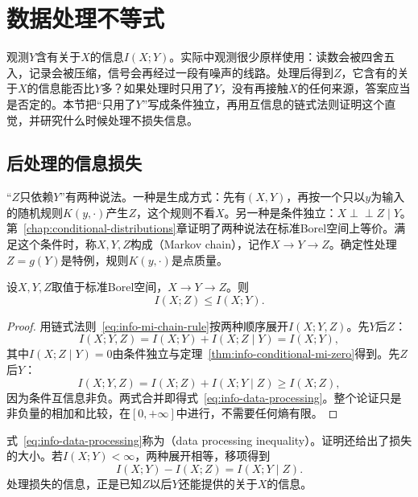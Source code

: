 \section{数据处理不等式}
\label{sec:info-data-processing}

观测$Y$含有关于$X$的信息$I(X;Y)$。实际中观测很少原样使用：读数会被四舍五入，记录会被压缩，信号会再经过一段有噪声的线路。处理后得到$Z$，它含有的关于$X$的信息能否比$Y$多？如果处理时只用了$Y$，没有再接触$X$的任何来源，答案应当是否定的。本节把“只用了$Y$”写成条件独立，再用互信息的链式法则证明这个直觉，并研究什么时候处理不损失信息。

\subsection{后处理的信息损失}
\label{sec:info-dpi-loss}

“$Z$只依赖$Y$”有两种说法。一种是生成方式：先有$(X,Y)$，再按一个只以$y$为输入的随机规则$K(y,\cdot)$产生$Z$，这个规则不看$X$。另一种是条件独立：$X\perp\!\!\!\perp Z\mid Y$。第~\ref{chap:conditional-distributions}章证明了两种说法在标准Borel空间上等价。满足这个条件时，称$X,Y,Z$构成（Markov chain），记作$X\to Y\to Z$。确定性处理$Z=g(Y)$是特例，规则$K(y,\cdot)$是点质量。

\begin{theorem}[数据处理不等式]
\label{thm:info-data-processing}
设$X,Y,Z$取值于标准Borel空间，$X\to Y\to Z$。则
\begin{equation}
  I(X;Z)\leq I(X;Y).
  \label{eq:info-data-processing}
\end{equation}
\end{theorem}

\begin{proof}
用链式法则~\eqref{eq:info-mi-chain-rule}按两种顺序展开$I(X;Y,Z)$。先$Y$后$Z$：
\[
  I(X;Y,Z)=I(X;Y)+I(X;Z\mid Y)=I(X;Y),
\]
其中$I(X;Z\mid Y)=0$由条件独立与定理~\ref{thm:info-conditional-mi-zero}得到。先$Z$后$Y$：
\[
  I(X;Y,Z)=I(X;Z)+I(X;Y\mid Z)\geq I(X;Z),
\]
因为条件互信息非负。两式合并即得式~\eqref{eq:info-data-processing}。整个论证只是非负量的相加和比较，在$[0,+\infty]$中进行，不需要任何熵有限。
\end{proof}

式~\eqref{eq:info-data-processing}称为（data processing inequality）。证明还给出了损失的大小。若$I(X;Y)<\infty$，两种展开相等，移项得到
\begin{equation}
  I(X;Y)-I(X;Z)=I(X;Y\mid Z).
  \label{eq:info-dpi-gap}
\end{equation}
处理损失的信息，正是已知$Z$以后$Y$还能提供的关于$X$的信息。


